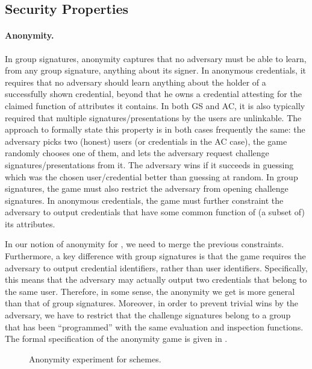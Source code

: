 \subsection{Security Properties}
\label{ssec:security}

\paragraph{Anonymity.} %
In group signatures, anonymity captures that no adversary must be able to learn,
from any group signature, anything about its signer. In anonymous credentials,
it requires that no adversary should learn anything about the holder of a
successfully shown credential, beyond that he owns a credential attesting for
the claimed function of attributes it contains. In both GS and AC, it is also
typically required that
multiple signatures/presentations by the users are unlinkable. The approach to
formally state this property is in both cases frequently the same: the adversary
picks two (honest) users (or credentials in the AC case), the game randomly
chooses one of them, and lets the adversary request challenge
signatures/presentations from it. The adversary wins if it succeeds in guessing
which was the chosen user/credential better than guessing at random. In group
signatures, the game must also restrict the adversary from opening challenge
signatures. In anonymous credentials, the game must further constraint the
adversary to output credentials that have some common function of (a subset of)
its attributes.

In our notion of anonymity for \UAS, we need to merge the previous constraints.
Furthermore, a key difference with group signatures is that the game requires
the adversary to output credential identifiers, rather than user identifiers.
Specifically, this means that the adversary may actually output two credentials
that belong to the same user. Therefore, in some sense, the anonymity we get is
more general than that of group signatures. Moreover, in order to prevent
trivial wins by the adversary, we have to restrict that the challenge signatures
belong to a group that has been ``programmed'' with the same evaluation and
inspection functions. The formal specification of the anonymity game is given in
. 

\begin{figure}[htp!]
  \caption{Anonymity experiment for \UAS schemes.}
  \label{fig:exp-uas-anonb}
\end{figure}

